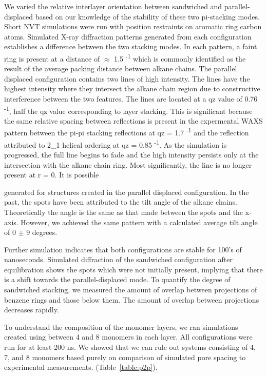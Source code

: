 We varied the relative interlayer orientation between sandwiched and 
parallel-displaced based on our knowledge of the stability of these two
pi-stacking modes. Short NVT simulations were run with position restraints
on aromatic ring carbon atoms. Simulated X-ray diffraction patterns 
generated from each configuration establishes a difference between the two
stacking modes. In each pattern, a faint ring is present at a distance of
$\approx$ 1.5 \angstrom \textsuperscript{-1} which is commonly identified
as the result of the average packing distance between alkane chains. 
The parallel displaced configuration contains two lines of high intensity.
The lines have the highest intensity where they intersect the alkane chain region
due to constructive interference between the two features. The lines are located 
at a qz value of 0.76 \angstrom \textsuperscript{-1}, half the qz value corresponding
to layer stacking. This is significant because the same relative spacing between 
reflections is present in the expermental WAXS pattern between the pi-pi stacking
reflections at qz = 1.7 \angstrom \textsuperscript{-1} and the reflection attributed
to 2_1 helical ordering at qz = 0.85 \angstrom \textsuperscript{-1}. As the 
simulation is progressed, the full line begins to fade and the high intensity
persists only at the intersection with the alkane chain ring. Most significantly, 
the line is no longer present at r = 0. It is possible  

generated for structures created in the parallel displaced configuration.
In the past, the spots have been attributed to the tilt angle of the 
alkane chains. Theoretically the angle is the same as that made between 
the spots and the x-axis. However, we achieved the same pattern with 
a calculated average tilt angle of 0 $\pm$ 9 degrees. %

Further simulation indicates that both configurations are stable for 
100's of nanoseconds. Simulated diffraction of the sandwiched 
configuration after equilibration shows the spots which were not initially
present, implying that there is a shift towards the parallel-displaced
mode. To quantify the degree of sandwiched stacking, we measured the 
amount of overlap between projections of benzene rings and those below
them. The amount of overlap between projections decreases rapidly. %
	
To understand the composition of the monomer layers, we ran simulations
created using between 4 and 8 monomers in each layer. All configurations 
were run for at least 200 ns. We showed that we can rule out systems 
consisting of 4, 7, and 8 monomers based purely on comparison of 
simulated pore spacing to experimental measurements.
(Table~\ref{table:p2p}). 
        
